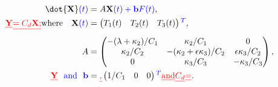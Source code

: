 \documentclass[gmd, manuscript]{copernicus}
\providecommand{\DIFadd}[1]{{\protect\color{blue}#1}} %
\providecommand{\DIFdel}[1]{{\protect\color{red}\sout{#1}}}                      %
\providecommand{\DIFaddbegin}{} %
\providecommand{\DIFaddend}{} %
\providecommand{\DIFdelbegin}{} %
\providecommand{\DIFdelend}{} %
\begin{document}
\DIFaddend \begin{align}
    \mathbf{\dot{X}}\DIFaddbegin \DIFadd{(t)}\DIFaddend &=A\mathbf{X}\DIFaddbegin \DIFadd{(t)+\mathbf{b}F(t)}\DIFaddend ,\label{eq:statespace}\\
    \DIFdelbegin \DIFdel{\mathbf{Y} }%
\DIFdel{= C_d\mathbf{X};}%
\DIFdelend \text{where} \quad \mathbf{X}\DIFaddbegin \DIFadd{(t) }\DIFaddend &= 
    \DIFdelbegin %
\DIFdelend \DIFaddbegin \begin{pmatrix}
        T_1(t) & T_2(t) & T_3(t)
    \end{pmatrix}\DIFadd{^T}\DIFaddend ,\nonumber\\
    A &= 
    \DIFdelbegin %
\DIFdelend \DIFaddbegin \begin{pmatrix}
    -(\lambda+\kappa_2)/C_1 & \kappa_2/C_1 & 0\\
    \kappa_2/C_2 & -(\kappa_2+\epsilon\kappa_3)/C_2 & \epsilon\kappa_3/C_2\\
    0 & \kappa_3/C_3 & -\kappa_3/C_3
    \end{pmatrix}\DIFaddend ,\nonumber \\
    \DIFdelbegin \DIFdel{\mathbf{Y} }\DIFdelend \DIFaddbegin \DIFadd{\text{~~and~~}\mathbf{b} }\DIFaddend &= 
    \DIFdelbegin %
\DIFdel{,}\DIFdelend \DIFaddbegin \begin{pmatrix}
        1/C_1 & 0 & 0
    \end{pmatrix}\DIFadd{^T }\DIFaddend \nonumber\DIFdelbegin %
\DIFdel{\text{and} }%
\DIFdel{C_d }%
\DIFdel{=
    }%
\DIFdelend .
\DIFdelbegin %
\DIFdelend \end{align}\DIFaddbegin \\
\end{document}
